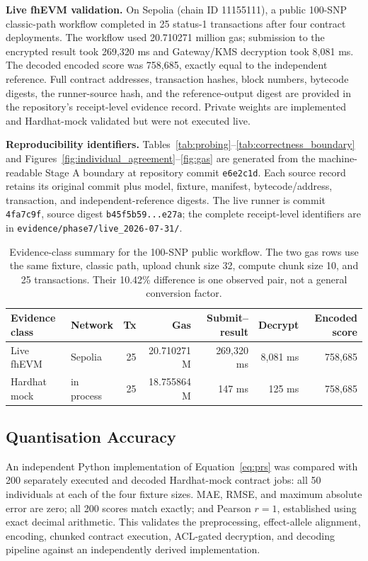 \documentclass[10pt,twocolumn]{article}
\begin{document}
\textbf{Live fhEVM validation.} On Sepolia (chain ID 11155111), a public 100-SNP
classic-path workflow completed in 25 status-1 transactions after four contract
deployments.  The workflow used 20.710271 million gas; submission to the encrypted
result took 269,320 ms and Gateway/KMS decryption took 8,081 ms.  The decoded encoded
score was 758,685, exactly equal to the independent reference.  Full contract addresses,
transaction hashes, block numbers, bytecode digests, the runner-source hash, and the
reference-output digest are provided in the repository's receipt-level evidence record.
Private weights are implemented and Hardhat-mock validated but were not executed live.

\textbf{Reproducibility identifiers.} Tables~\ref{tab:probing}--\ref{tab:correctness_boundary}
and Figures~\ref{fig:individual_agreement}--\ref{fig:gas} are generated from the
machine-readable Stage A boundary at repository commit \texttt{e6e2c1d}.  Each source
record retains its original commit plus model, fixture, manifest, bytecode/address,
transaction, and independent-reference digests.  The live runner is commit
\texttt{4fa7c9f}, source digest \texttt{b45f5b59...e27a}; the complete receipt-level
identifiers are in \texttt{evidence/phase7/live\_2026-07-31/}.

\begin{table}[t]
\centering
\caption{Evidence-class summary for the 100-SNP public workflow.  The two gas rows use
the same fixture, classic path, upload chunk size 32, compute chunk size 10, and 25
transactions.  Their 10.42\% difference is one observed pair, not a general conversion
factor.}
\label{tab:live_validation}
\small
\begin{tabular}{llrrrrr}
\toprule
\textbf{Evidence class} & \textbf{Network} & \textbf{Tx} & \textbf{Gas} & \textbf{Submit--result} & \textbf{Decrypt} & \textbf{Encoded score} \\
\midrule
Live fhEVM & Sepolia & 25 & 20.710271 M & 269,320 ms & 8,081 ms & 758,685 \\
Hardhat mock & in process & 25 & 18.755864 M & 147 ms & 125 ms & 758,685 \\
\bottomrule
\end{tabular}
\end{table}

\subsection{Quantisation Accuracy}

An independent Python implementation of Equation~\ref{eq:prs} was compared with 200
separately executed and decoded Hardhat-mock contract jobs: all 50 individuals at each
of the four fixture sizes.  MAE, RMSE, and maximum absolute error are zero; all 200
scores match exactly; and Pearson $r=1$, established using exact decimal arithmetic.
This validates the preprocessing, effect-allele alignment, encoding, chunked contract
execution, ACL-gated decryption, and decoding pipeline against an independently derived
implementation.
\end{document}
